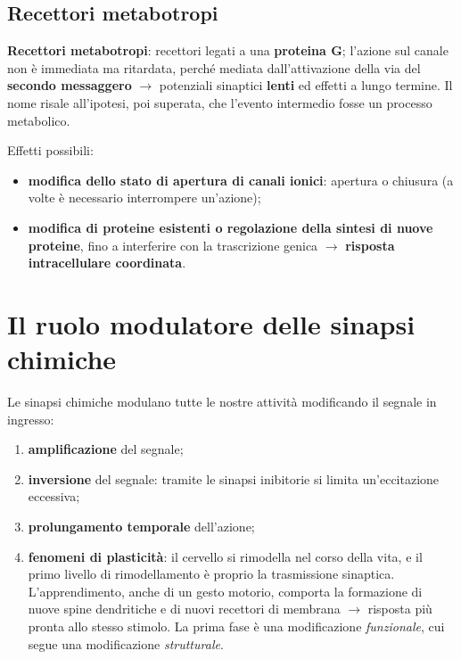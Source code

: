 \subsection{Recettori metabotropi}

\textbf{Recettori metabotropi}: recettori legati a una \textbf{proteina G}; l'azione sul canale non
è immediata ma ritardata, perché mediata dall'attivazione della via del \textbf{secondo
messaggero} $\rightarrow$ potenziali sinaptici \textbf{lenti} ed effetti a lungo termine. Il nome
risale all'ipotesi, poi superata, che l'evento intermedio fosse un processo metabolico.

Effetti possibili:
\begin{itemize}
  \item \textbf{modifica dello stato di apertura di canali ionici}: apertura o chiusura (a volte è
    necessario interrompere un'azione);
  \item \textbf{modifica di proteine esistenti o regolazione della sintesi di nuove proteine}, fino
    a interferire con la trascrizione genica $\rightarrow$ \textbf{risposta intracellulare
    coordinata}.
\end{itemize}

\section{Il ruolo modulatore delle sinapsi chimiche}

Le sinapsi chimiche modulano tutte le nostre attività modificando il segnale in ingresso:
\begin{enumerate}
  \item \textbf{amplificazione} del segnale;
  \item \textbf{inversione} del segnale: tramite le sinapsi inibitorie si limita un'eccitazione
    eccessiva;
  \item \textbf{prolungamento temporale} dell'azione;
  \item \textbf{fenomeni di plasticità}: il cervello si rimodella nel corso della vita, e il primo
    livello di rimodellamento è proprio la trasmissione sinaptica. L'apprendimento, anche di un
    gesto motorio, comporta la formazione di nuove spine dendritiche e di nuovi recettori di
    membrana $\rightarrow$ risposta più pronta allo stesso stimolo. La prima fase è una
    modificazione \textit{funzionale}, cui segue una modificazione \textit{strutturale}.
\end{enumerate}
